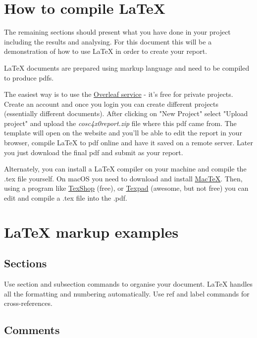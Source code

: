 \documentclass[12pt]{article}
\begin{document}
\section{How to compile \LaTeX{}}

The remaining sections should present what you have done in your project including the results and analysing.  For this document this will be a demonstration of how to use \LaTeX{} in order to create your report.

\LaTeX{} documents are prepared using markup language and need to be compiled to produce pdfs.

The easiest way is to use the \href{https://www.overleaf.com}{Overleaf service} - it's free for private projects.  Create an account and once you login you can create different projects (essentially different documents).  After clicking on "New Project" select "Upload project" and upload the \textit{cosc4x0report.zip} file where this pdf came from.  The template will open on the website and you'll be able to edit the report in your browser, compile LaTeX to pdf online and have it saved on a remote server.  Later you just download the final pdf and submit as your report.

Alternately, you can install a LaTeX compiler on your machine and compile the .tex file yourself.  On macOS you need to download and install \href{http://www.tug.org/mactex/downloading.html}{MacTeX}.  Then, using a program like \href{http://pages.uoregon.edu/koch/texshop/}{TexShop} (free), or \href{https://www.texpad.com/}{Texpad} (awesome, but not free) you can edit and compile a .tex file into the .pdf.

\section{\LaTeX{} markup examples}
\label{sec:examples}

\subsection{Sections}

Use section and subsection commands to organise your document. \LaTeX{} handles all the formatting and numbering automatically. Use ref and label commands for cross-references.

\subsection{Comments}
\end{document}
